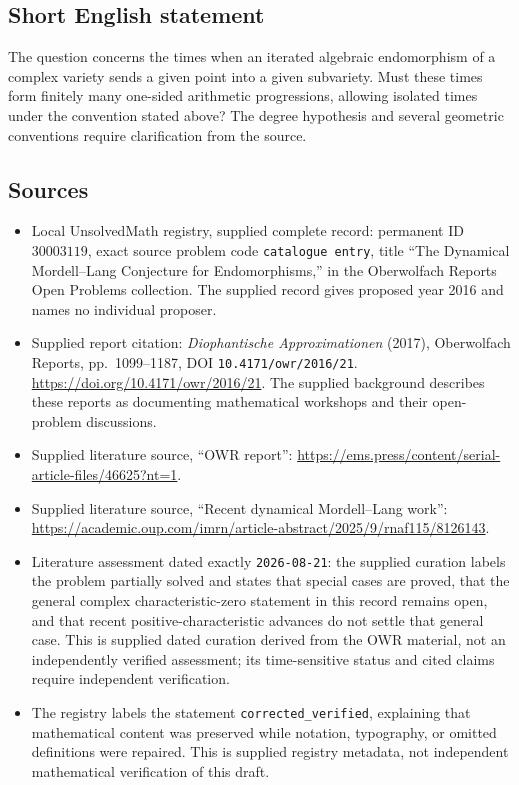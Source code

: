 \documentclass[11pt]{article}
\begin{document}
\subsection{Short English statement}
The question concerns the times when an iterated algebraic endomorphism of a complex variety sends a given point into a given subvariety. Must these times form finitely many one-sided arithmetic progressions, allowing isolated times under the convention stated above? The degree hypothesis and several geometric conventions require clarification from the source.
\subsection{Sources}
\begin{itemize}
\item Local UnsolvedMath registry, supplied complete record: permanent ID \(30003119\), exact source problem code \texttt{catalogue entry}, title ``The Dynamical Mordell--Lang Conjecture for Endomorphisms,'' in the Oberwolfach Reports Open Problems collection. The supplied record gives proposed year 2016 and names no individual proposer.
\item Supplied report citation: \emph{Diophantische Approximationen} (2017), Oberwolfach Reports, pp.\ 1099--1187, DOI \texttt{10.4171/owr/2016/21}. \url{https://doi.org/10.4171/owr/2016/21}. The supplied background describes these reports as documenting mathematical workshops and their open-problem discussions.
\item Supplied literature source, ``OWR report'': \url{https://ems.press/content/serial-article-files/46625?nt=1}.
\item Supplied literature source, ``Recent dynamical Mordell--Lang work'': \url{https://academic.oup.com/imrn/article-abstract/2025/9/rnaf115/8126143}.
\item Literature assessment dated exactly \texttt{2026-08-21}: the supplied curation labels the problem partially solved and states that special cases are proved, that the general complex characteristic-zero statement in this record remains open, and that recent positive-characteristic advances do not settle that general case. This is supplied dated curation derived from the OWR material, not an independently verified assessment; its time-sensitive status and cited claims require independent verification.
\item The registry labels the statement \texttt{corrected\_verified}, explaining that mathematical content was preserved while notation, typography, or omitted definitions were repaired. This is supplied registry metadata, not independent mathematical verification of this draft.
\end{itemize}
\end{document}
